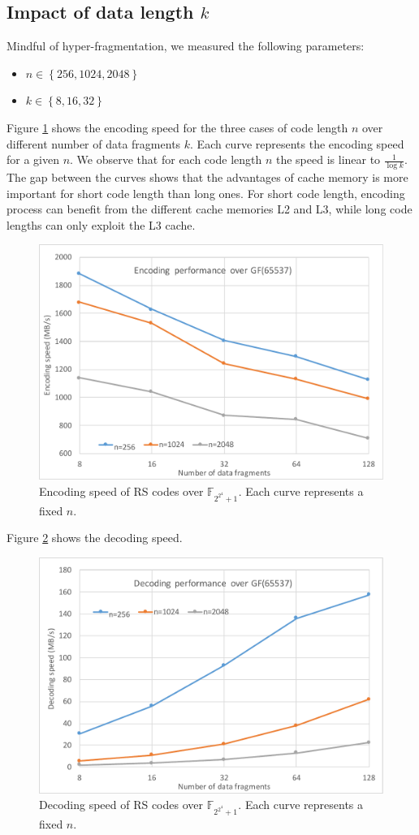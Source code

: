 \documentclass[oneside,9pt]{article}
\newcommand{\gf}[2][]{ \mathbb{F}_{{#2}^{#1}} }
\begin{document}
\subsection{Impact of data length $k$}
Mindful of hyper-fragmentation, we measured the following parameters:

\begin{itemize}
\item $n \in \left\{ 256, 1024, 2048 \right\}$
\item $k \in \left\{ 8, 16, 32 \right\}$
\end{itemize}

Figure \ref{fig:fnt_k_n} shows the encoding speed for the three cases of code length $n$ over different number of data fragments $k$. Each curve represents the encoding speed for a given $n$. We observe that for each code length $n$ the speed is linear to $\frac{1}{\log{k}}$. The gap between the curves shows that the advantages of cache memory is more important for short code length than long ones. For short code length, encoding process can benefit from the different cache memories L2 and L3, while long code lengths can only exploit the L3 cache.
% 
% 
\begin{figure}[!ht]
\centering
\includegraphics[width=0.7\columnwidth]{fnt_k_n.pdf}
\caption{Encoding speed of RS codes over $\gf{2^{2^4}+1}$. Each curve represents a fixed $n$.}
\label{fig:fnt_k_n}
\end{figure}

Figure \ref{fig:dec_fnt_k_n} shows the decoding speed.

\begin{figure}[!ht]
\centering
\includegraphics[width=0.7\columnwidth]{dec_fnt_k_n.pdf}
\caption{Decoding speed of RS codes over $\gf{2^{2^4}+1}$. Each curve represents a fixed $n$.}
\label{fig:dec_fnt_k_n}
\end{figure}
\end{document}
